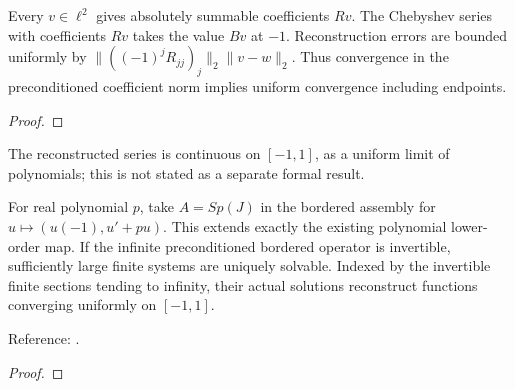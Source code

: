 \begin{theorem}
\label{thm:first-order-reconstruction}
\leanok
Every $v\in\ell^2$ gives absolutely summable coefficients $Rv$. The Chebyshev series with coefficients $Rv$ takes the value $Bv$ at $-1$. Reconstruction errors are bounded uniformly by $\|((-1)^jR_{jj})_j\|_2\|v-w\|_2$. Thus convergence in the preconditioned coefficient norm implies uniform convergence including endpoints.
\end{theorem}
\begin{proof}
\leanok
\end{proof}

The reconstructed series is continuous on $[-1,1]$, as a uniform limit of
polynomials; this is not stated as a separate formal result.

\begin{theorem}
\label{thm:first-order-polynomial-convergence}
\leanok
For real polynomial $p$, take $A=S p(J)$ in the bordered assembly for $u\mapsto (u(-1),u\prime+pu)$. This extends exactly the existing polynomial lower-order map. If the infinite preconditioned bordered operator is invertible, sufficiently large finite systems are uniquely solvable. Indexed by the
invertible finite sections tending to infinity, their actual solutions
reconstruct functions converging uniformly on $[-1,1]$.

Reference: \cite[Section 4.2]{olver-townsend}.
\end{theorem}
\begin{proof}
\leanok
\end{proof}

